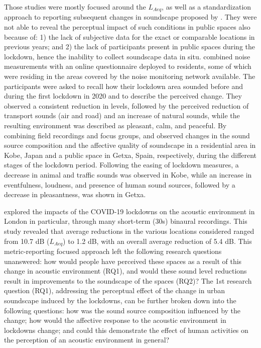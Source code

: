 \documentclass[
  authoryear,
  preprint,
  3p,
  onecolumn]{elsarticle}
\begin{document}
Those studies were mostly focused around the \(L_{Aeq}\), as well as a
standardization approach to reporting subsequent changes in soundscape
proposed by \citet{Asensio2020Taxonomy}. They were not able to reveal
the perceptual impact of such conditions in public spaces also because
of: 1) the lack of subjective data for the exact or comparable locations
in previous years; and 2) the lack of participants present in public
spaces during the lockdown, hence the inability to collect soundscape
data in situ. \citet{Munoz2020Lockdown} combined noise measurements with
an online questionnaire deployed to residents, some of which were
residing in the areas covered by the noise monitoring network available.
The participants were asked to recall how their lockdown area sounded
before and during the first lockdown in 2020 and to describe the
perceived change. They observed a consistent reduction in levels,
followed by the perceived reduction of transport sounds (air and road)
and an increase of natural sounds, while the resulting environment was
described as pleasant, calm, and peaceful. By combining field recordings
and focus groups, \citet{Sakagami2020How} and
\citet{Lenzi2021Soundscape} observed changes in the sound source
composition and the affective quality of soundscape in a residential
area in Kobe, Japan and a public space in Getxa, Spain, respectively,
during the different stages of the lockdown period. Following the easing
of lockdown measures, a decrease in animal and traffic sounds was
observed in Kobe, while an increase in eventfulness, loudness, and
presence of human sound sources, followed by a decrease in pleasantness,
was shown in Getxa.

\citet{Aletta2020Assessing} explored the impacts of the COVID-19
lockdowns on the acoustic environment in London in particular, through
many short-term (30s) binaural recordings. This study revealed that
average reductions in the various locations considered ranged from 10.7
dB (\(L_{Aeq}\)) to 1.2 dB, with an overall average reduction of 5.4 dB.
This metric-reporting focused approach left the following research
questions unanswered: how would people have perceived these spaces as a
result of this change in acoustic environment (RQ1), and would these
sound level reductions result in improvements to the soundscape of the
spaces (RQ2)? The 1st research question (RQ1), addressing the perceptual
effect of the change in urban soundscape induced by the lockdowns, can
be further broken down into the following questions: how was the sound
source composition influenced by the change; how would the affective
response to the acoustic environment in lockdowns change; and could this
demonstrate the effect of human activities on the perception of an
acoustic environment in general?
\end{document}
